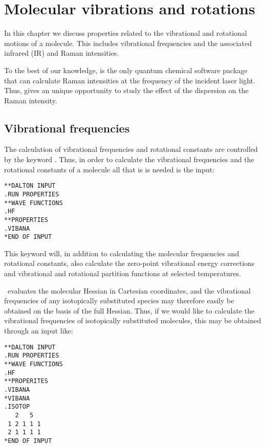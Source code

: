 \chapter{Molecular vibrations and rotations}\label{ch:vibrot}

In this chapter we discuss properties related  to the
vibrational and rotational motions of a molecule. This includes
vibrational frequencies and the associated infrared
(IR) and Raman intensities.

To the best of our knowledge, {\dalton} is the only quantum chemical
software package that can calculate Raman intensities at the frequency
of the incident laser light. Thus, {\dalton} gives an unique
opportunity to study the effect of the dispersion on the Raman
intensity.

\section{Vibrational frequencies}\label{sec:vibfreq}

The calculation of vibrational frequencies and rotational constants are
controlled by the keyword . Thus, in order to
calculate the vibrational frequencies and the rotational constants
of a molecule all that is is needed is the input:

\begin{verbatim}
**DALTON INPUT
.RUN PROPERTIES
**WAVE FUNCTIONS
.HF
**PROPERTIES
.VIBANA
*END OF INPUT
\end{verbatim}

This keyword will, in addition to calculating the molecular frequencies
and rotational constants, also calculate the zero-point vibrational
energy corrections and vibrational
and rotational partition functions
at selected temperatures.

\siraba\ evaluates the molecular Hessian in Cartesian
coordinates, and
the vibrational frequencies of any isotopically substituted  species
may therefore easily be obtained on the basis of the full
Hessian. Thus, if we would like to calculate the vibrational
frequencies of isotopically substituted molecules, this may be obtained through an input like:

\begin{verbatim}
**DALTON INPUT
.RUN PROPERTIES
**WAVE FUNCTIONS
.HF
**PROPERITES
.VIBANA
*VIBANA
.ISOTOP
   2   5
 1 2 1 1 1
 2 1 1 1 1
*END OF INPUT
\end{verbatim}

